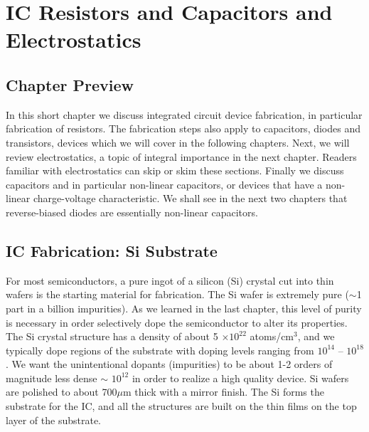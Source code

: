\chapter{IC Resistors and Capacitors and Electrostatics}
\graphicspath{{./figs_ic_tech/}}
\section{Chapter Preview}
In this short chapter we discuss integrated circuit device fabrication, in particular fabrication of resistors.  The fabrication steps also apply to capacitors, diodes and transistors, devices which we will cover in the following chapters.  Next, we will review electrostatics, a topic of integral importance in the next chapter.  Readers familiar with electrostatics can skip or skim these sections.  Finally we discuss capacitors and in particular non-linear capacitors, or devices that have a non-linear charge-voltage characteristic.  We shall see in the next two chapters that reverse-biased diodes are essentially non-linear capacitors.
\section{IC Fabrication: Si Substrate}
For most semiconductors, a pure ingot of a silicon (Si) crystal cut into thin wafers is the starting material for fabrication.  The Si wafer is extremely pure ($\sim$1 part in a billion impurities).  As we learned in the last chapter, this level of purity is necessary in order selectively dope the semiconductor to alter its properties.  The Si crystal structure has a density of about 5 $\times 10^{22}$ atoms/cm$^3$, and we typically dope regions of the substrate with doping levels ranging from  $10^{14}$ – $10^{18}$.  We want the  unintentional dopants (impurities) to be about 1-2 orders of magnitude less dense $\sim$ $10^{12}$ in order to realize a high quality device.  
Si wafers are polished to about 700$\mu$m thick with a mirror finish.   The Si forms the substrate for the IC, and all the structures are built on the thin films on the top layer of the substrate.  
